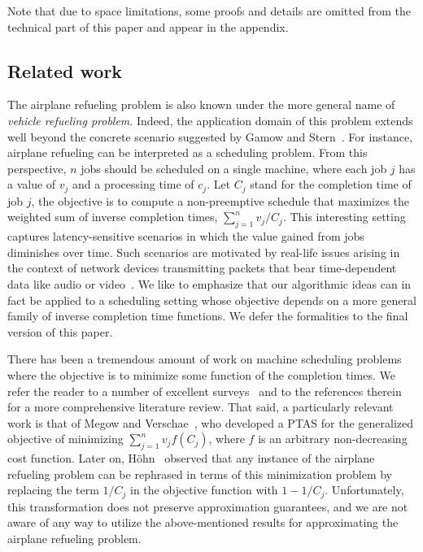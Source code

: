 \documentclass[11pt]{article}
\theoremstyle{plain}
\theoremstyle{definition}
\begin{document}
Note that due to space limitations, some proofs and details are omitted from the technical part of this paper and appear in the appendix.

\subsection{Related work} \label{subsec:related_work}
The airplane refueling problem is also known under the more general name of \textit{vehicle refueling problem}. Indeed, the application domain of this problem extends well beyond the concrete scenario suggested by Gamow and Stern~\cite{GamowS58}. For instance, airplane refueling can be interpreted as a scheduling problem. From this perspective, $n$ jobs should be scheduled on a single machine, where each job $j$ has a value of $v_j$ and a processing time of $c_j$. Let $C_j$ stand for the completion time of job $j$, the objective is to compute a non-preemptive schedule that maximizes the weighted sum of inverse completion times, $\sum_{j = 1}^n v_j / C_j$. This interesting setting captures latency-sensitive scenarios in which the value gained from jobs diminishes over time. Such scenarios are motivated by real-life issues arising in the context of network devices transmitting packets that bear
time-dependent data like audio or video~\cite{FiatMN08,FeldmanN10}. We like to emphasize that our algorithmic ideas can in fact be applied to a scheduling setting whose objective depends on a more general family of inverse completion time functions. We defer the formalities to the final version of this paper.

There has been a tremendous amount of work on machine scheduling problems where the objective is to minimize some function of the completion times. We refer the reader to a number of excellent surveys~\cite{ChekuriK04,Wiebke14} and to the references therein for a more comprehensive literature review. That said, a particularly relevant work is that of Megow and Verschae~\cite{MegowV13}, who developed a PTAS for the generalized objective of minimizing $\sum_{j = 1}^n v_j f(C_j)$, where $f$ is an arbitrary non-decreasing cost function. Later on, H{\"o}hn~\cite{Wiebke14} observed that any instance of the airplane refueling problem can be rephrased in terms of this minimization problem by replacing the term $1 / C_j$ in the objective function with $1 - 1 /C_j$. Unfortunately, this transformation does not preserve approximation guarantees, and we are not aware of any way to utilize the above-mentioned results for approximating the airplane refueling problem.
\end{document}
